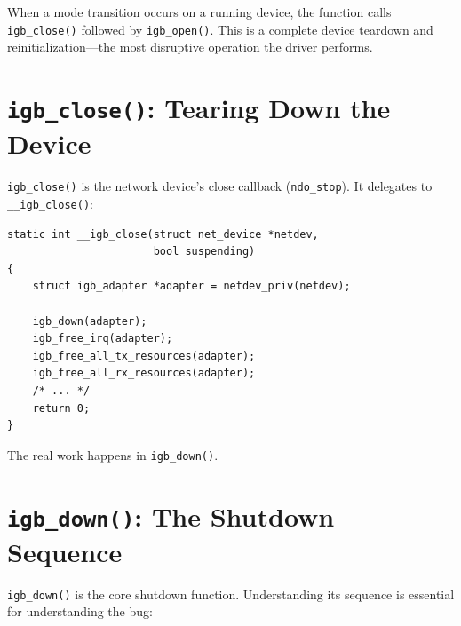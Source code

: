 \documentclass[11pt,a4paper,openany]{book}
\newcommand{\func}[1]{\texttt{#1()}}
\begin{document}
When a mode transition occurs on a running device, the function calls
\func{igb\_close} followed by \func{igb\_open}.  This is a complete
device teardown and reinitialization---the most disruptive operation
the driver performs.

\section{\texttt{igb\_close()}: Tearing Down the Device}

\func{igb\_close} is the network device's close callback
(\texttt{ndo\_stop}).  It delegates to \func{\_\_igb\_close}:

\begin{lstlisting}[caption={\texttt{igb\_close()} and \texttt{\_\_igb\_close()} (igb\_main.c:4259)}]
static int __igb_close(struct net_device *netdev,
                       bool suspending)
{
    struct igb_adapter *adapter = netdev_priv(netdev);

    igb_down(adapter);
    igb_free_irq(adapter);
    igb_free_all_tx_resources(adapter);
    igb_free_all_rx_resources(adapter);
    /* ... */
    return 0;
}
\end{lstlisting}

The real work happens in \func{igb\_down}.

\section{\texttt{igb\_down()}: The Shutdown Sequence}
\label{sec:igb-down}

\func{igb\_down} is the core shutdown function.  Understanding its
sequence is essential for understanding the bug:
\end{document}
